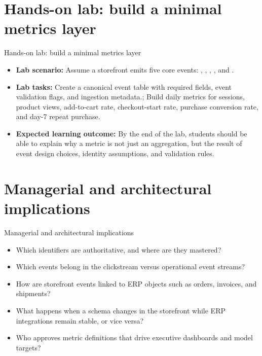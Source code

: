 \documentclass[aspectratio=169]{beamer}
\begin{document}
\section{Hands-on lab: build a minimal metrics layer}

\begin{frame}{Hands-on lab: build a minimal metrics layer}
  \begin{itemize}
    \item \textbf{Lab scenario:} Assume a storefront emits five core events: , , , , and .
    \item \textbf{Lab tasks:} Create a canonical event table with required fields, event validation flags, and ingestion metadata.; Build daily metrics for sessions, product views, add-to-cart rate, checkout-start rate, purchase conversion rate, and day-7 repeat purchase.
    \item \textbf{Expected learning outcome:} By the end of the lab, students should be able to explain why a metric is not just an aggregation, but the result of event design choices, identity assumptions, and validation rules.
  \end{itemize}
\end{frame}

\section{Managerial and architectural implications}

\begin{frame}{Managerial and architectural implications}
  \begin{itemize}
    \item Which identifiers are authoritative, and where are they mastered?
    \item Which events belong in the clickstream versus operational event streams?
    \item How are storefront events linked to ERP objects such as orders, invoices, and shipments?
    \item What happens when a schema changes in the storefront while ERP integrations remain stable, or vice versa?
    \item Who approves metric definitions that drive executive dashboards and model targets?
  \end{itemize}
\end{frame}
\end{document}
